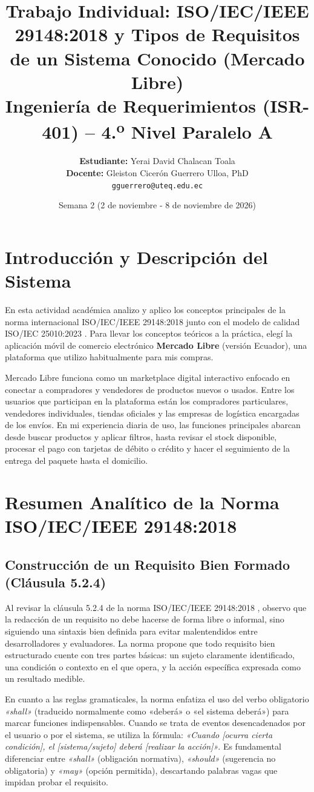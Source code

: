 \documentclass[11pt, a4paper]{article}
\title{\textbf{Trabajo Individual: ISO/IEC/IEEE 29148:2018 y Tipos de Requisitos de un Sistema Conocido (Mercado Libre)}\\ \large Ingeniería de Requerimientos (ISR-401) -- 4.\textsuperscript{o} Nivel Paralelo A}
\author{\textbf{Estudiante:} Yerai David Chalacan Toala \\ \textbf{Docente:} Gleiston Cicerón Guerrero Ulloa, PhD \\ \texttt{gguerrero@uteq.edu.ec}}
\date{Semana 2 (2 de noviembre - 8 de noviembre de 2026)}
\begin{document}
\maketitle

\section{Introducción y Descripción del Sistema}
En esta actividad académica analizo y aplico los conceptos principales de la norma internacional ISO/IEC/IEEE 29148:2018 \cite{iso29148} junto con el modelo de calidad ISO/IEC 25010:2023 \cite{iso25010}. Para llevar los conceptos teóricos a la práctica, elegí la aplicación móvil de comercio electrónico \textbf{Mercado Libre} (versión Ecuador), una plataforma que utilizo habitualmente para mis compras.

Mercado Libre funciona como un marketplace digital interactivo enfocado en conectar a compradores y vendedores de productos nuevos o usados. Entre los usuarios que participan en la plataforma están los compradores particulares, vendedores individuales, tiendas oficiales y las empresas de logística encargadas de los envíos. En mi experiencia diaria de uso, las funciones principales abarcan desde buscar productos y aplicar filtros, hasta revisar el stock disponible, procesar el pago con tarjetas de débito o crédito y hacer el seguimiento de la entrega del paquete hasta el domicilio.

\section{Resumen Analítico de la Norma ISO/IEC/IEEE 29148:2018}

\subsection{Construcción de un Requisito Bien Formado (Cláusula 5.2.4)}
Al revisar la cláusula 5.2.4 de la norma ISO/IEC/IEEE 29148:2018 \cite{iso29148}, observo que la redacción de un requisito no debe hacerse de forma libre o informal, sino siguiendo una sintaxis bien definida para evitar malentendidos entre desarrolladores y evaluadores. La norma propone que todo requisito bien estructurado cuente con tres partes básicas: un sujeto claramente identificado, una condición o contexto en el que opera, y la acción específica expresada como un resultado medible.

En cuanto a las reglas gramaticales, la norma enfatiza el uso del verbo obligatorio \textit{«shall»} (traducido normalmente como «deberá» o «el sistema deberá») para marcar funciones indispensables. Cuando se trata de eventos desencadenados por el usuario o por el sistema, se utiliza la fórmula: \textit{«Cuando [ocurra cierta condición], el [sistema/sujeto] deberá [realizar la acción]»}. Es fundamental diferenciar entre \textit{«shall»} (obligación normativa), \textit{«should»} (sugerencia no obligatoria) y \textit{«may»} (opción permitida), descartando palabras vagas que impidan probar el requisito.
\end{document}
